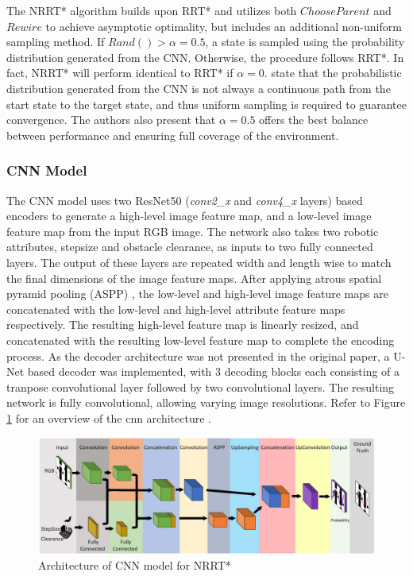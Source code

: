 \documentclass{article}
\begin{document}
The NRRT* algorithm builds upon RRT* and utilizes both $ChooseParent$ and $Rewire$ to achieve asymptotic optimality, but includes an additional non-uniform sampling method. If $Rand() > \alpha = 0.5$, a state is sampled using the probability distribution generated from the CNN. Otherwise, the procedure follows RRT*. In fact, NRRT* will perform identical to RRT* if $\alpha = 0$. \citet{nrrt} state that the probabilistic distribution generated from the CNN is not always a continuous path from the start state to the target state, and thus uniform sampling is required to guarantee convergence. The authors also present that $\alpha = 0.5$ offers the best balance between performance and ensuring full coverage of the environment.

\subsubsection{CNN Model}
The CNN model uses two ResNet50 (\emph{conv2\_x} and \emph{conv4\_x} layers)\cite{resnet} based encoders to generate a high-level image feature map, and a low-level image feature map from the input RGB image. The network also takes two robotic attributes, stepsize and obstacle clearance, as inputs to two fully connected layers. The output of these layers are repeated width and length wise to match the final dimensions of the image feature maps.
After applying atrous spatial pyramid pooling (ASPP) \cite{aspp}, the low-level and high-level image feature maps are concatenated with the low-level and high-level attribute feature maps respectively. The resulting high-level feature map is linearly resized, and concatenated with the resulting low-level feature map to complete the encoding process. As the decoder architecture was not presented in the original paper, a U-Net based decoder was implemented, with 3 decoding blocks each consisting of a tranpose convolutional layer followed by two convolutional layers. The resulting network is fully convolutional, allowing varying image resolutions. Refer to Figure \ref{fig:architecture} for an overview of the cnn architecture \cite{nrrt}.

\begin{figure}[H]
\includegraphics[width=\textwidth]{cnn_architecture}
\centering
\caption{Architecture of CNN model for NRRT*}
\label{fig:architecture}
\end{figure}
\end{document}
